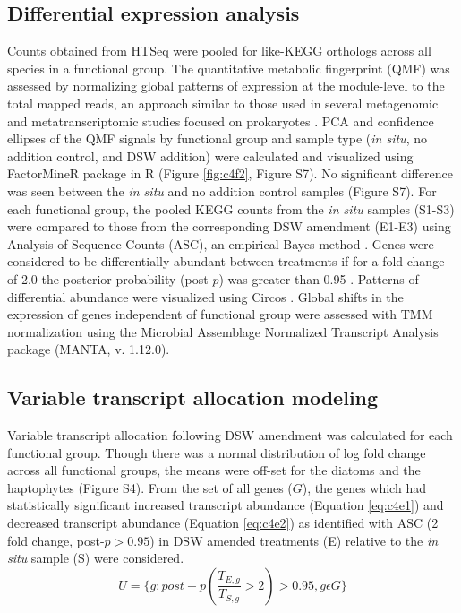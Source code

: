 \subsection{Differential expression analysis}
Counts obtained from HTSeq were pooled for like-KEGG orthologs across all species in a functional group. The quantitative metabolic fingerprint (QMF) was assessed by normalizing global patterns of expression at the module-level to the total mapped reads, an approach similar to those used in several metagenomic and metatranscriptomic studies focused on prokaryotes \citep{Shi2011, Ottesen2014, Shi2012}. PCA and confidence ellipses of the QMF signals by functional group and sample type (\textit{in situ}, no addition control, and DSW addition) were calculated and visualized using FactorMineR package in R (Figure \ref{fig:c4f2}, Figure S7). No significant difference was seen between the \textit{in situ} and no addition control samples (Figure S7). For each functional group, the pooled KEGG counts from the \textit{in situ} samples (S1-S3) were compared to those from the corresponding DSW amendment (E1-E3) using Analysis of Sequence Counts (ASC), an empirical Bayes method \citep{Wu2010}. Genes were considered to be differentially abundant between treatments if for a fold change of 2.0 the posterior probability (post-$p$) was greater than 0.95 \citep{Dyhrman2012}. Patterns of differential abundance were visualized using Circos \citep{Krzywinski2009}. Global shifts in the expression of genes independent of functional group were assessed with TMM normalization using the Microbial Assemblage Normalized Transcript Analysis package (MANTA, v. 1.12.0)\citep{Marchetti2012}. \par
\subsection{Variable transcript allocation modeling} 
Variable transcript allocation following DSW amendment was calculated for each functional group. Though there was a normal distribution of log fold change across all functional groups, the means were off-set for the diatoms and the haptophytes (Figure S4). From the set of all genes ($G$), the genes which had statistically significant increased transcript abundance (Equation \ref{eq:c4e1}) and decreased transcript abundance (Equation \ref{eq:c4e2}) as identified with ASC (2 fold change, post-$p > 0.95$) \citep{Wu2010} in DSW amended treatments (E) relative to the \textit{in situ} sample (S) were considered. 
\begin{equation}
	\label{eq:c4e1}
	 U = \{g : post-p(\frac{T_{E,g}}{T_{S,g}} > 2) > 0.95, g \epsilon G\}
\end{equation}

